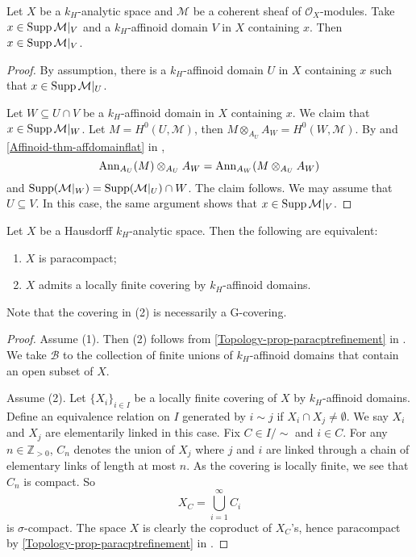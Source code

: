 \begin{lemma}
    Let $X$ be a $k_H$-analytic space and $\mathcal{M}$ be a coherent sheaf of $\mathcal{O}_X$-modules. Take $x\in \operatorname{Supp} \mathcal{M}|_V$ and a $k_H$-affinoid domain $V$ in $X$ containing $x$. Then $x\in \operatorname{Supp} \mathcal{M}|_V$.
\end{lemma}
\begin{proof}
By assumption, there is a $k_H$-affinoid domain $U$ in $X$ containing $x$ such that $x\in \operatorname{Supp}\mathcal{M}|_U$. 

Let $W\subseteq U\cap V$ be a $k_H$-affinoid domain in $X$ containing $x$. We claim that $x\in \operatorname{Supp} \mathcal{M}|_W$. Let $M=H^0(U,\mathcal{M})$, then $M\otimes_{A_U} A_W=H^0(W,\mathcal{M})$. By \cite[\href{https://stacks.math.columbia.edu/tag/07T8}{Tag 07T8}]{stacks-project} and \cref{Affinoid-thm-affdomainflat} in ,
\[
    \mathrm{Ann}_{A_U}(M)\otimes_{A_U} A_W=    \mathrm{Ann}_{A_W}(M\otimes_{A_U}A_W)
\]  
and $\operatorname{Supp} (\mathcal{M}|_W)=\operatorname{Supp} (\mathcal{M}|_U)\cap W$.
The claim follows. We may assume that $U\subseteq V$. In this case, the same argument shows that $x\in \operatorname{Supp} \mathcal{M}|_V$.
\end{proof}


\begin{proposition}\label{prop-paracompactanalyticgcovering}
    Let $X$ be a Hausdorff $k_H$-analytic space. Then the following are equivalent:
    \begin{enumerate}
        \item $X$ is paracompact;
        \item $X$ admits a locally finite covering by $k_H$-affinoid domains. 
    \end{enumerate}
\end{proposition}
Note that the covering in (2) is necessarily a G-covering.
\begin{proof}
    Assume (1). Then (2) follows from \cref{Topology-prop-paracptrefinement} in . We take $\mathcal{B}$ to the collection of finite unions of $k_H$-affinoid domains that contain an open subset of $X$.

    Assume (2). Let $\{X_i\}_{i\in I}$ be a locally finite covering of $X$ by $k_H$-affinoid domains. Define an equivalence relation on $I$ generated by $i\sim j$ if $X_i\cap X_j\neq \emptyset$. We say $X_i$ and $X_j$ are elementarily linked in this case.
    Fix $C\in I/\sim$ and $i\in C$. For any $n\in \mathbb{Z}_{>0}$, $C_n$ denotes the union of $X_j$ where $j$ and $i$ are linked through a chain of elementary links of length at most $n$. As the covering is locally finite, we see that $C_n$ is compact. So 
    \[
        X_C=\bigcup_{i=1}^{\infty}C_i
    \]
    is $\sigma$-compact. The space $X$ is clearly the coproduct of $X_C$'s, hence paracompact by \cref{Topology-prop-paracptrefinement} in .
\end{proof}



